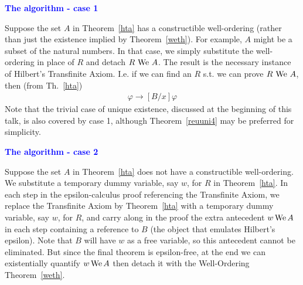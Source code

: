 \documentclass{slides}
\begin{document}
\begin{slide}

\begin{center}
\textcolor{blue}{\textbf{The algorithm - case 1}}
\end{center}

Suppose the set $A$ in Theorem~\ref{hta} has a constructible well-ordering
(rather than just the existence implied by Theorem~\ref{weth}).
For example,
 $A$ might be a subset of the natural
numbers.  In that case, we
simply substitute the well-ordering in place of $R$ and
 detach $R \,\,{\rm We}\,\, A$.  The result is the necessary
instance of Hilbert's
Transfinite Axiom.  I.e. if we can find an $R$ s.t. we
can prove $R \,\,{\rm We}\,\, A$,
then (from Th.~\ref{hta})
\begin{eqnarray}
   \varphi \rightarrow [ B / x ] \varphi
\end{eqnarray}
Note that the trivial case of unique existence, discussed at the
beginning of this talk, is also covered by case 1, although
Theorem~\ref{reuuni4} may be preferred for simplicity.



\end{slide}

\begin{slide}

\begin{center}
\textcolor{blue}{\textbf{The algorithm - case 2}}
\end{center}

Suppose the set $A$ in Theorem~\ref{hta} does not have a constructible
well-ordering.  We substitute a temporary dummy variable, say $w$, for
$R$ in Theorem~\ref{hta}.  In each step in the epsilon-calculus proof
referencing the Transfinite Axiom, we replace the Transfinite Axiom by
Theorem~\ref{hta} with a temporary dummy variable, say $w$, for $R$, and
carry along in the proof the extra antecedent $w\,{\rm We}\, A$ in each
step containing a reference to $B$ (the object that emulates Hilbert's
epsilon).  Note that $B$ will have $w$ as a free variable, so this
antecedent cannot be eliminated.  But since the final theorem is
epsilon-free, at the end we can existentially quantify $w\,{\rm We}\, A$
then detach it with the Well-Ordering Theorem~\ref{weth}.

\end{slide}
\end{document}
